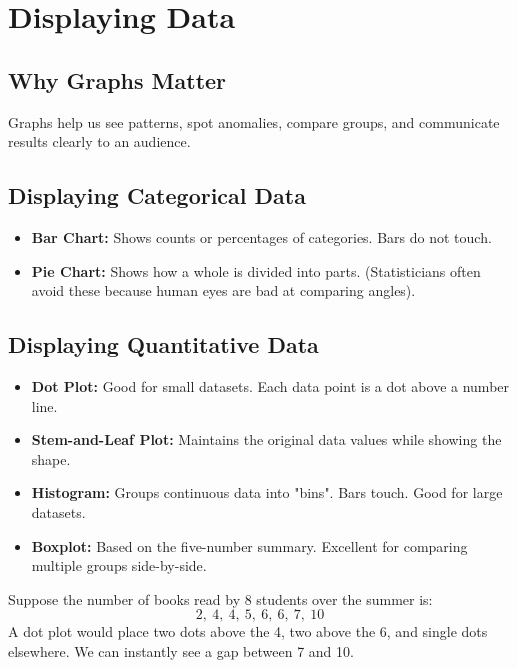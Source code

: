 \documentclass[11pt,openany]{book}
\begin{document}
\chapter{Displaying Data}

\section{Why Graphs Matter}
Graphs help us see patterns, spot anomalies, compare groups, and communicate results clearly to an audience.

\section{Displaying Categorical Data}
\begin{itemize}
    \item \textbf{Bar Chart:} Shows counts or percentages of categories. Bars do not touch.
    \item \textbf{Pie Chart:} Shows how a whole is divided into parts. (Statisticians often avoid these because human eyes are bad at comparing angles).
\end{itemize}

\section{Displaying Quantitative Data}
\begin{itemize}
    \item \textbf{Dot Plot:} Good for small datasets. Each data point is a dot above a number line.
    \item \textbf{Stem-and-Leaf Plot:} Maintains the original data values while showing the shape.
    \item \textbf{Histogram:} Groups continuous data into "bins". Bars touch. Good for large datasets.
    \item \textbf{Boxplot:} Based on the five-number summary. Excellent for comparing multiple groups side-by-side.
\end{itemize}

\begin{examplebox}
Suppose the number of books read by 8 students over the summer is:
\[
2,\ 4,\ 4,\ 5,\ 6,\ 6,\ 7,\ 10
\]
A dot plot would place two dots above the 4, two above the 6, and single dots elsewhere. We can instantly see a gap between 7 and 10.
\end{examplebox}
\end{document}
